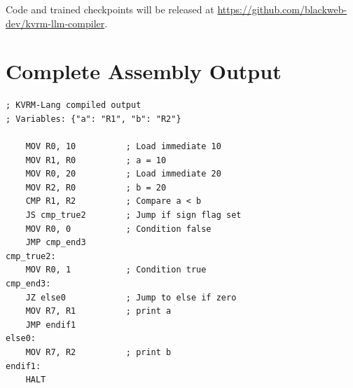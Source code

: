 \documentclass[11pt,a4paper]{article}
\begin{document}
Code and trained checkpoints will be released at \url{https://github.com/blackweb-dev/kvrm-llm-compiler}.

\section{Complete Assembly Output}
\label{app:assembly}

\begin{lstlisting}[language={[x86masm]Assembler}, caption=Full Assembly for Conditional Program]
; KVRM-Lang compiled output
; Variables: {"a": "R1", "b": "R2"}

    MOV R0, 10          ; Load immediate 10
    MOV R1, R0          ; a = 10
    MOV R0, 20          ; Load immediate 20
    MOV R2, R0          ; b = 20
    CMP R1, R2          ; Compare a < b
    JS cmp_true2        ; Jump if sign flag set
    MOV R0, 0           ; Condition false
    JMP cmp_end3
cmp_true2:
    MOV R0, 1           ; Condition true
cmp_end3:
    JZ else0            ; Jump to else if zero
    MOV R7, R1          ; print a
    JMP endif1
else0:
    MOV R7, R2          ; print b
endif1:
    HALT
\end{lstlisting}
\end{document}
